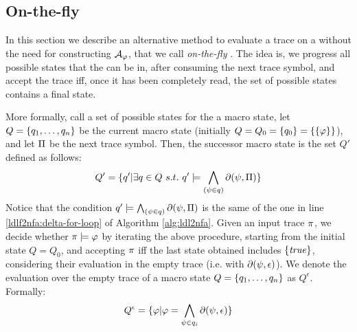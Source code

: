 \subsection{On-the-fly \DFA}
In this section we describe an alternative method to evaluate a trace on a \DFA without the need for constructing $\mathcal{A}_\varphi$, that we call \emph{on-the-fly} \citep{AAAI1817342}. The idea is, we progress all possible states that the \NFA can be in, after consuming the next trace symbol, and accept the trace iff, once it has been completely read, the set of possible states contains a final state.

More formally, call a set of possible
states for the \NFA a macro state, let $Q = \{q_1, \dots, q_n\}$ be the current macro state (initially $Q = Q_0 = \{q_0\} = \{\{\varphi\}\}$), and
let $\Pi$ be the next trace symbol. Then, the successor macro state is the set $Q'$ defined as follows: 
\begin{equation}\label{eq:on-the-fly-progression-rule}
Q' = \{q' | \exists q \in Q\ s.t.\ q' \models \bigwedge_{(\psi \in q)} \partial(\psi, \Pi)\}
\end{equation} Notice that the condition $q' \models \bigwedge_{(\psi \in q)} \partial(\psi, \Pi)$ is the same of the one in line \ref{ldlf2nfa:delta-for-loop} of Algorithm \ref{alg:ldl2nfa}.
Given an input trace $\pi$, we decide whether $\pi \models \varphi$ by iterating
the above procedure, starting from the initial state $Q = Q_0$,
and accepting $\pi$ iff the last state obtained includes $\{\mathit{true}\}$, considering their evaluation in the empty trace (i.e. with $\partial\lparen \psi, \epsilon\rparen$). We denote the evaluation over the empty trace of a macro state $Q = \{q_1, \dots, q_n\}$ as $Q^\epsilon$. Formally:
\begin{equation}\label{eq:macro-state-epsilon}
Q^\epsilon = \{\varphi | \varphi = \bigwedge_{\psi\in q_i} \partial\lparen \psi, \epsilon\rparen\}
\end{equation}

